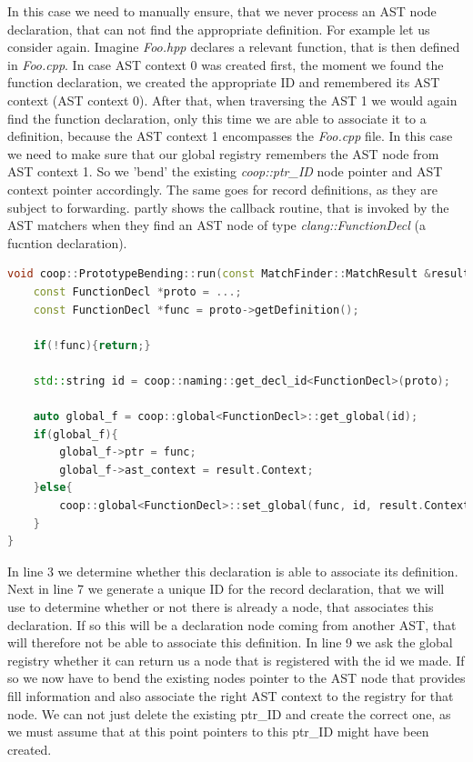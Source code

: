 In this case we need to manually ensure, that we never process an AST node declaration, that can not find the appropriate definition. For example let us consider  again. Imagine \textit{Foo.hpp} declares a relevant function, that is then defined in \textit{Foo.cpp}. In case AST context 0 was created first, the moment we found the function declaration, we created the appropriate ID and remembered its AST context (AST context 0). After that, when traversing the AST 1 we would again find the function declaration, only this time we are able to associate it to a definition, because the AST context 1 encompasses the \textit{Foo.cpp} file. In this case we need to make sure that our global registry remembers the AST node from AST context 1. So we 'bend' the existing \textit{coop::ptr\_ID} node pointer and AST context pointer accordingly. The same goes for record definitions, as they are subject to forwarding.  partly shows the callback routine, that is invoked by the AST matchers when they find an AST node of type \textit{clang::FunctionDecl} (a fucntion declaration).
\begin{lstlisting}[language=C++, name={Shortened excerpt of the callback routine, that registers function declarations for COOP in the data aggregation step.},label={bending}]
void coop::PrototypeBending::run(const MatchFinder::MatchResult &result){
	const FunctionDecl *proto = ...;
	const FunctionDecl *func = proto->getDefinition();
	
	if(!func){return;}

	std::string id = coop::naming::get_decl_id<FunctionDecl>(proto);
	
	auto global_f = coop::global<FunctionDecl>::get_global(id);
	if(global_f){
		global_f->ptr = func;
		global_f->ast_context = result.Context;
	}else{
		coop::global<FunctionDecl>::set_global(func, id, result.Context);
	}
}
\end{lstlisting}
In line 3 we determine whether this declaration is able to associate its definition. Next in line 7 we generate a unique ID for the record declaration, that we will use to determine whether or not there is already a node, that associates this declaration. If so this will be a declaration node coming from another AST, that will therefore not be able to associate this definition. In line 9 we ask the global registry whether it can return us a node that is registered with the id we made. If so we now have to bend the existing nodes pointer to the AST node that provides fill information and also associate the right AST context to the registry for that node. We can not just delete the existing ptr\_ID and create the correct one, as we must assume that at this point pointers to this ptr\_ID might have been created.


